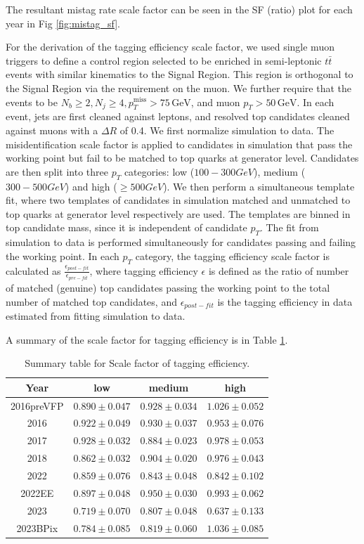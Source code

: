 \documentclass[twoside]{article}
\begin{document}
The resultant mistag rate scale factor can be seen in the SF (ratio) plot for each year in Fig \ref{fig:mistag_sf}.

For the derivation of the tagging efficiency scale factor, we used single muon triggers to define a control region selected to be enriched in semi-leptonic $t\bar{t}$ events with similar kinematics to the Signal Region. This region is orthogonal to the Signal Region via the requirement on the muon. We further require that the events to be $N_b \geq 2, N_j \geq 4, p_T^{\text{miss}} > 75\, \text{GeV}$, and muon $ p_T > 50\, \text{GeV}.$ In each event, jets are first cleaned against leptons, and resolved top candidates cleaned against muons with a $\Delta R$ of 0.4. We first normalize simulation to data. The misidentification scale factor is applied to candidates in simulation that pass the working point but fail to be matched to top quarks at generator level. Candidates are then split into three $p_T$ categories: low ($100-300GeV$), medium ($300-500GeV$) and high ($\ge500GeV$). We then perform a simultaneous template fit, where two templates of candidates in simulation matched and unmatched to top quarks at generator level respectively are used. The templates are binned in top candidate mass, since it is independent of candidate $p_T$. The fit from simulation to data is performed simultaneously for candidates passing and failing the working point. In each $p_T$ category, the tagging efficiency scale factor is calculated as $\frac{\epsilon_{post-fit}}{\epsilon_{pre-fit}}$, where tagging efficiency $\epsilon$ is defined as the ratio of number of matched (genuine) top candidates passing the working point to the total number of matched top candidates, and $\epsilon_{post-fit}$ is the tagging efficiency in data estimated from fitting simulation to data.

A summary of the scale factor for tagging efficiency is in Table \ref{tab:restop_sf_tageff}.

\begin{table}[ht]
\centering
\begin{tabular}{|c|c|c|c|}
\hline
\textbf{Year} & \textbf{low} & \textbf{medium} & \textbf{high} \\
\hline
2016preVFP & $0.890\pm0.047$ & $0.928\pm0.034$ & $1.026\pm0.052$ \\
2016 & $0.922\pm0.049$ & $0.930\pm0.037$ & $0.953\pm0.076$ \\
2017 & $0.928\pm0.032$ & $0.884\pm0.023$ & $0.978\pm0.053$ \\
2018 & $0.862\pm0.032$ & $0.904\pm0.020$ & $0.976\pm0.043$ \\
2022 & $0.859\pm0.076$ & $0.843\pm0.048$ & $0.842\pm0.102$ \\
2022EE & $0.897\pm0.048$ & $0.950\pm0.030$ & $0.993\pm0.062$ \\
2023 & $0.719\pm0.070$ & $0.807\pm0.048$ & $0.637\pm0.133$ \\
2023BPix & $0.784\pm0.085$ & $0.819\pm0.060$ & $1.036\pm0.085$ \\
\hline
\end{tabular}
\caption{Summary table for Scale factor of  tagging efficiency.}
\label{tab:restop_sf_tageff}
\end{table}
\end{document}
